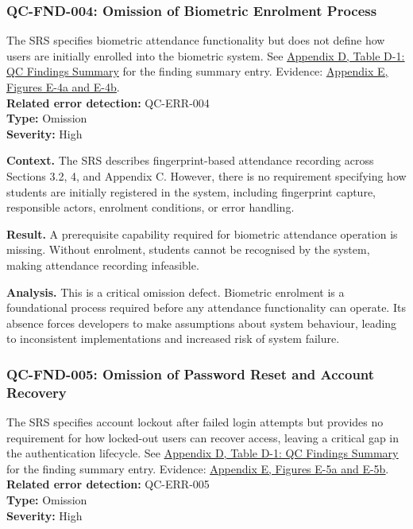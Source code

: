 \documentclass[11pt,a4paper]{article}
\let\orighyperref\hyperref
\renewcommand{\hyperref}[2][]{\orighyperref[#1]{\uline{#2}}}
\begin{document}
\subsubsection*{QC-FND-004: Omission of Biometric Enrolment Process}
The SRS specifies biometric attendance functionality but does not define how users are initially enrolled into the biometric system. See \hyperref[tab:qc-findings-summary]{Appendix D, Table D-1: QC Findings Summary} for the finding summary entry. Evidence: \hyperref[fig:evidence-004]{Appendix E, Figures E-4a and E-4b}. \\
\textbf{Related error detection:} QC-ERR-004 \\
\textbf{Type:} Omission \\
\textbf{Severity:} High

\textbf{Context.} The SRS describes fingerprint-based attendance recording across Sections 3.2, 4, and Appendix C. However, there is no requirement specifying how students are initially registered in the system, including fingerprint capture, responsible actors, enrolment conditions, or error handling.

\textbf{Result.} A prerequisite capability required for biometric attendance operation is missing. Without enrolment, students cannot be recognised by the system, making attendance recording infeasible.

\textbf{Analysis.} This is a critical omission defect. Biometric enrolment is a foundational process required before any attendance functionality can operate. Its absence forces developers to make assumptions about system behaviour, leading to inconsistent implementations and increased risk of system failure.

\subsubsection*{QC-FND-005: Omission of Password Reset and Account Recovery}
The SRS specifies account lockout after failed login attempts but provides no requirement for how locked-out users can recover access, leaving a critical gap in the authentication lifecycle. See \hyperref[tab:qc-findings-summary]{Appendix D, Table D-1: QC Findings Summary} for the finding summary entry. Evidence: \hyperref[fig:evidence-005]{Appendix E, Figures E-5a and E-5b}. \\
\textbf{Related error detection:} QC-ERR-005 \\
\textbf{Type:} Omission \\
\textbf{Severity:} High
\end{document}
